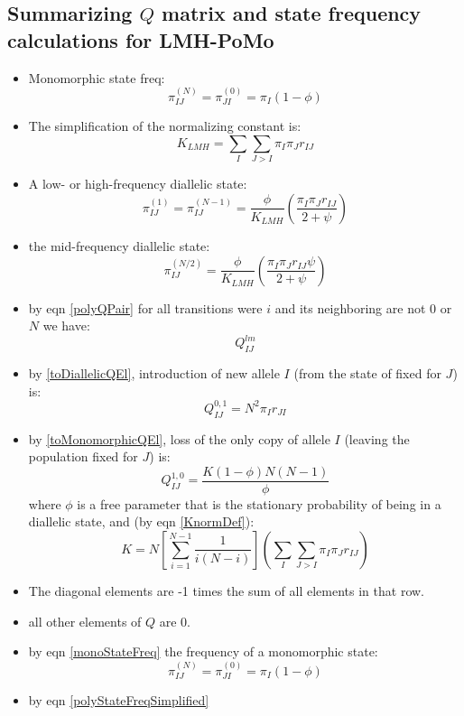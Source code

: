 \documentclass{llncs}
\newcommand{\polyProb}{\ensuremath{\phi}}
\newcommand{\Knorm}{\ensuremath{K}}
\newcommand{\Klmh}{\ensuremath{K_{LMH}}}
\begin{document}
\subsection*{Summarizing $Q$ matrix and state frequency calculations for LMH-PoMo}
\begin{itemize}
  \item Monomorphic state freq: $$\pi_{IJ}^{(N)} = \pi_{JI}^{(0)} = \pi_I(1-\polyProb) $$
  \item The simplification of the normalizing constant is:
  $$\Klmh = \sum_I\sum_{J > I}\pi_I\pi_J r_{IJ}$$
  \item A low- or high-frequency diallelic state: 
     $$\pi_{IJ}^{(1)} = \pi_{IJ}^{(N-1)}  =  \frac{\polyProb}{\Klmh }\left( \frac{\pi_I\pi_J r_{IJ}}{2 + \psi}\right) $$
  \item the mid-frequency diallelic state: 
     $$\pi_{IJ}^{(N/2)} =  \frac{\polyProb}{\Klmh }\left( \frac{\pi_I\pi_J r_{IJ}\psi}{2 + \psi}\right) $$
  \item by eqn \ref{polyQPair} for all transitions were $i$ and its neighboring are not $0$ or $N$ we have:
    $$Q_{IJ}^{lm}  $$
  \item by \ref{toDiallelicQEl}, introduction of new allele $I$ (from the state of fixed for $J$) is:
    $$Q_{IJ}^{0,1} = N^2 \pi_I r_{JI} $$ 
  \item by \ref{toMonomorphicQEl}, loss of the only copy of allele $I$ (leaving the population fixed for $J$) is: 
    $$Q_{IJ}^{1,0} =  \frac{\Knorm (1-\polyProb)N(N-1)}{\polyProb }$$
   where $\polyProb$ is a free parameter that is the stationary probability of being in a diallelic state, and (by eqn \ref{KnormDef}):
    $$\Knorm = N\left[\sum_{i=1}^{N-1} \frac{1}{i(N-i)}\right]\left(\sum_I \sum_{J > I}\pi_I\pi_J r_{IJ}\right) $$
  \item The diagonal elements are -1 times the sum of all elements in that row.
  \item all other elements of $Q$ are 0.
  \item by eqn \ref{monoStateFreq} the frequency of a monomorphic state: 
     $$\pi_{IJ}^{(N)} = \pi_{JI}^{(0)} = \pi_I(1-\polyProb) $$
    \item by eqn \ref{polyStateFreqSimplified} 
\end{itemize}





\end{document}
